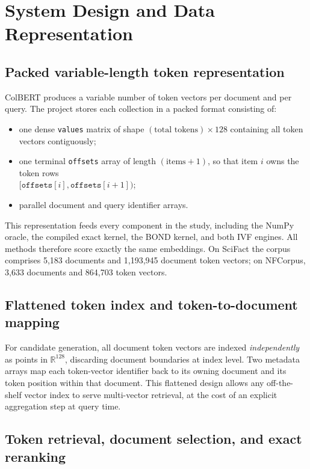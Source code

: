 \section{System Design and Data Representation}
\label{sec:architecture}

\subsection{Packed variable-length token representation}

ColBERT produces a variable number of token vectors per document and per
query. The project stores each collection in a packed format consisting of:

\begin{itemize}[noitemsep]
  \item one dense \texttt{values} matrix of shape
    $(\text{total tokens}) \times 128$ containing all token vectors
    contiguously;
  \item one terminal \texttt{offsets} array of length $(\text{items} + 1)$,
    so that item $i$ owns the token rows\\
    $[\texttt{offsets}[i], \texttt{offsets}[i+1])$;
  \item parallel document and query identifier arrays.
\end{itemize}

This representation feeds every component in the study, including the NumPy oracle, 
the compiled exact kernel, the BOND kernel, and both IVF engines. 
All methods therefore score exactly the same embeddings. 
On SciFact the corpus comprises 5,183 documents and 1,193,945 document token vectors; 
on NFCorpus, 3,633 documents and 864,703 token vectors.

\subsection{Flattened token index and token-to-document mapping}

For candidate generation, all document token vectors are indexed
\emph{independently} as points in $\mathbb{R}^{128}$, discarding document
boundaries at index level. Two metadata arrays map each token-vector
identifier back to its owning document and its token position within that
document. This flattened design allows any off-the-shelf vector index to serve
multi-vector retrieval, at the cost of an explicit aggregation step at query
time.

\subsection{Token retrieval, document selection, and exact reranking}
\label{sec:three-stages}

